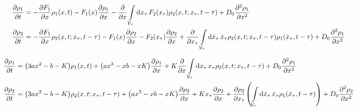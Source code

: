 \documentclass[a4paper,10pt]{article}
\newcommand{\intl}{\int\limits}
\begin{document}
\begin{align}
	\pdv{\rho_1}{t}
	&=
	- 
	\pdv{F_1}{x}
	\rho_1
	(x,t)
	-
	F_1(x)
	\pdv{\rho_1}{x}
	-
	\pdv{x}
	\intl_{\mathcal{V}_\tau}
	\dd{x_\tau}
	F_2(x_\tau)
	\rho_2
	(x,t;x_\tau,t-\tau)	
	+
	D_0
	\pdv[2]{\rho_1}{x}
\\
	\pdv{\rho_2}{t}
	&=
	- 
	\pdv{F_1}{x}
	\rho_2
	(x,t;x_\tau,t-\tau)
	-
	F_1(x)
	\pdv{\rho_2}{x}
	-
	F_2(x_\tau)
	\pdv{\rho_2}{x}
	+
	\pdv{x_\tau}
	\intl_{\mathcal{V}_\tau}
	\dd{\dot{x}_\tau}
	\dot{x}_\tau
	\rho_2
	(x,t;x_\tau,t-\tau)	
	\rho_1
	(\dot{x}_\tau,t-\tau)	
	+
	D_0
	\pdv[2]{\rho_1}{x}
\end{align}

\begin{align}
	\pdv{\rho_1}{t}
	&=
	\pqty{3ax^2-b-K}
	\rho_1
	(x,t)
	+
	\pqty{ax^3-xb-xK}
	\pdv{\rho_1}{x}
	+
	K
	\pdv{x}
	\intl_{\mathcal{V}_\tau}
	\dd{x_\tau}
	x_\tau
	\rho_2
	(x,t;x_\tau,t-\tau)	
	+
	D_0
	\pdv[2]{\rho_1}{x}
\\
	\pdv{\rho_2}{t}
	&=
	\pqty{3ax^2-b-K}
	\rho_2
	(x,t;x_\tau,t-\tau)
	+
	\pqty{ax^3-xb-xK}
	\pdv{\rho_2}{x}
	+
	Kx_\tau
	\pdv{\rho_2}{x}
	+
	\pdv{\rho_2}{x_\tau}
	\pqty{
		\intl_{\mathcal{V}_\tau}
		\dd{\dot{x}_\tau}
		\dot{x}_\tau
		\rho_1
		(\dot{x}_\tau,t-\tau)
	}
	+
	D_0
	\pdv[2]{\rho_2}{x}
\end{align}
\end{document}
